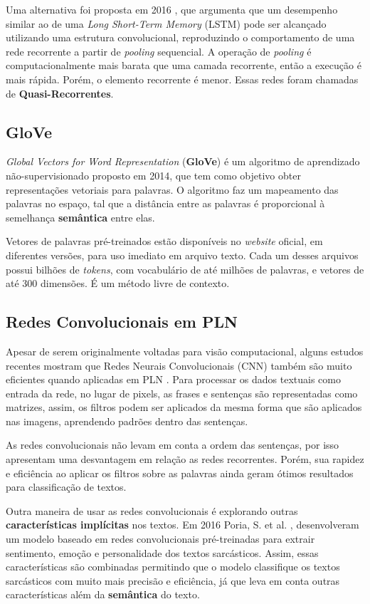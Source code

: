 \documentclass[twoside,conference,a4paper]{IEEEtran}
\begin{document}
    Uma alternativa foi proposta em 2016 \cite{qrnn}, que argumenta que um desempenho similar ao de uma \textit{Long Short-Term Memory} (LSTM) pode ser alcançado utilizando uma estrutura convolucional, reproduzindo o comportamento de uma rede recorrente a partir de \textit{pooling} sequencial. A operação de \textit{pooling} é computacionalmente mais barata que uma camada recorrente, então a execução é mais rápida. Porém, o elemento recorrente é menor. Essas redes foram chamadas de \textbf{Quasi-Recorrentes}.
 
\subsection{GloVe}
    \textit{Global Vectors for Word Representation} \cite{glove} (\textbf{GloVe}) é um algoritmo de aprendizado não-supervisionado proposto em 2014, que tem como objetivo obter representações vetoriais para palavras. O algoritmo faz um mapeamento das palavras no espaço, tal que a distância entre as palavras é proporcional à semelhança \textbf{semântica} entre elas.
    
    Vetores de palavras pré-treinados estão disponíveis no \textit{website} oficial, em diferentes versões, para uso imediato em arquivo texto. Cada um desses arquivos possui bilhões de \textit{tokens}, com vocabulário de até milhões de palavras, e vetores de até 300 dimensões. É um método livre de contexto.
    
\subsection{Redes Convolucionais em PLN} \label{cnn-nlp}
    Apesar de serem originalmente voltadas para visão computacional, alguns estudos recentes mostram que Redes Neurais Convolucionais (CNN) também são muito eficientes quando aplicadas em PLN \cite{cnn-sentence-class}. Para processar os dados textuais como entrada da rede, no lugar de pixels, as frases e sentenças são representadas como matrizes, assim, os filtros podem ser aplicados da mesma forma que são aplicados nas imagens, aprendendo padrões dentro das sentenças.
    
    As redes convolucionais não levam em conta a ordem das sentenças, por isso apresentam uma desvantagem em relação as redes recorrentes. Porém, sua rapidez e eficiência ao aplicar os filtros sobre as palavras ainda geram ótimos resultados para classificação de textos. 
    
    Outra maneira de usar as redes convolucionais é explorando outras \textbf{características implícitas} nos textos. Em 2016 Poria,  S. et al. \cite{cnn-sarcastic}, desenvolveram um modelo baseado em redes convolucionais pré-treinadas para extrair sentimento, emoção e personalidade dos textos sarcásticos. Assim, essas características são combinadas permitindo que o modelo classifique os textos sarcásticos com muito mais precisão e eficiência, já que leva em conta outras características além da \textbf{semântica} do texto.
\end{document}
